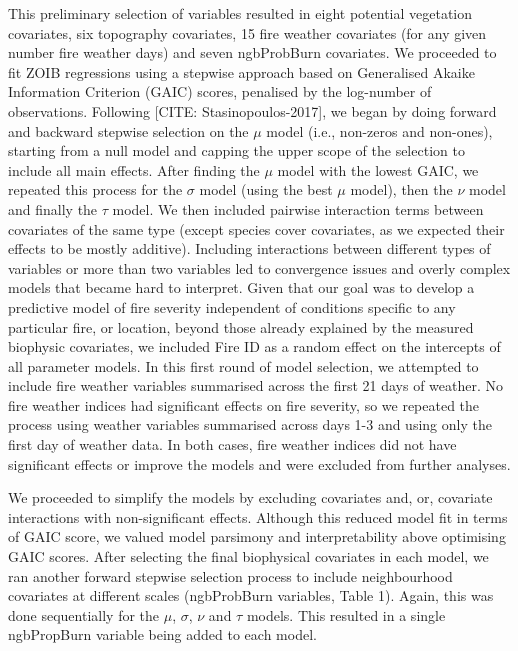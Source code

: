 \documentclass[
  numafflabel,
  authoryear,
  preprint]{elsarticle}
\begin{document}
This preliminary selection of variables resulted in eight potential
vegetation covariates, six topography covariates, 15 fire weather
covariates (for any given number fire weather days) and seven
ngbProbBurn covariates. We proceeded to fit ZOIB regressions using a
stepwise approach based on Generalised Akaike Information Criterion
(GAIC) scores, penalised by the log-number of observations. Following
{[}CITE: Stasinopoulos-2017{]}, we began by doing forward and backward
stepwise selection on the \(\mu\) model (i.e., non-zeros and non-ones),
starting from a null model and capping the upper scope of the selection
to include all main effects. After finding the \(\mu\) model with the
lowest GAIC, we repeated this process for the \(\sigma\) model (using
the best \(\mu\) model), then the \(\nu\) model and finally the \(\tau\)
model. We then included pairwise interaction terms between covariates of
the same type (except species cover covariates, as we expected their
effects to be mostly additive). Including interactions between different
types of variables or more than two variables led to convergence issues
and overly complex models that became hard to interpret. Given that our
goal was to develop a predictive model of fire severity independent of
conditions specific to any particular fire, or location, beyond those
already explained by the measured biophysic covariates, we included Fire
ID as a random effect on the intercepts of all parameter models. In this
first round of model selection, we attempted to include fire weather
variables summarised across the first 21 days of weather. No fire
weather indices had significant effects on fire severity, so we repeated
the process using weather variables summarised across days 1-3 and using
only the first day of weather data. In both cases, fire weather indices
did not have significant effects or improve the models and were excluded
from further analyses.

We proceeded to simplify the models by excluding covariates and, or,
covariate interactions with non-significant effects. Although this
reduced model fit in terms of GAIC score, we valued model parsimony and
interpretability above optimising GAIC scores. After selecting the final
biophysical covariates in each model, we ran another forward stepwise
selection process to include neighbourhood covariates at different
scales (ngbProbBurn variables, Table 1). Again, this was done
sequentially for the \(\mu\), \(\sigma\), \(\nu\) and \(\tau\) models.
This resulted in a single ngbPropBurn variable being added to each
model.
\end{document}
